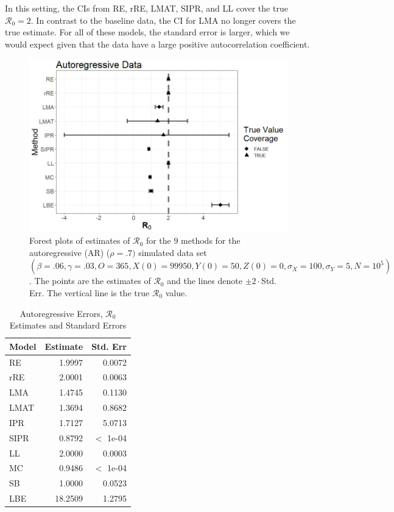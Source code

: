 \documentclass[12pt]{article}
\newcommand{\xxsir}{\ensuremath{9} } %
\newcommand{\rr}{\ensuremath{\mathcal{R}_0}}
\begin{document}
In this setting, the CIs from RE, rRE, LMAT, SIPR, and LL cover the true $\rr=2$.  In contrast to the baseline data, the CI for LMA no longer covers the true estimate.  For all of these models, the standard error is larger, which we would expect given that the data have a large positive autocorrelation coefficient.


\begin{figure}[H]
  \centering
  \includegraphics[scale=0.5]{images/AR.jpg}
  \caption{Forest plots of estimates of $\rr$ for the \xxsir methods for the autoregressive (AR) ($\rho=.7)$ simulated data set $(\beta=.06, \gamma=.03, O=365, X(0)=99950, Y(0)=50, Z(0)=0, \sigma_X=100, \sigma_Y=5, N=10^5)$.  The points are the estimates of $\rr$ and the lines denote $\pm 2\cdot $Std. Err.  The vertical line is the true $\rr$ value.}
  \end{figure}\label{fig:ar-res}
\begin{table}[H]
	
	\centering
	\begin{tabular}[t]{l|r|r}
		\hline
		Model & Estimate & Std. Err\\
		\hline
		RE & 1.9997 & 0.0072\\
		\hline
		rRE & 2.0001 & 0.0063\\
		\hline
		LMA & 1.4745 & 0.1130\\
		\hline
		LMAT & 1.3694 & 0.8682\\
		\hline
		IPR & 1.7127 & 5.0713\\
		\hline
		SIPR & 0.8792 & $<$ 1e-04 \\
		\hline
		LL & 2.0000 & 0.0003\\
		\hline
		MC & 0.9486 & $<$ 1e-04 \\
		\hline
		SB & 1.0000 & 0.0523\\
		\hline
		LBE & 18.2509 & 1.2795\\
		\hline
	\end{tabular}
        \caption{Autoregressive Errors, $\rr$ Estimates and Standard Errors}\label{tab:ar-res}
\end{table}
\end{document}
